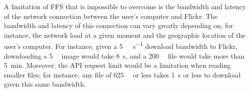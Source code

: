 A limitation of \gls{FFS} that is impossible to overcome is the bandwidth and latency of the network connection between the user's computer and Flickr. The bandwidth and latency of this connection can vary greatly depending on, for instance, the network load at a given moment and the geographic location of the user's computer. For instance, given a \SI[per-mode = symbol]{5}{\mega\bit\per\second} download bandwidth to Flickr, downloading a \SI[per-mode = symbol]{5}{\mega\byte} image would take \SI[per-mode = symbol]{8}{\second}, and a \SI[per-mode = symbol]{200}{\mega\byte} file would take more than \SI[per-mode = symbol]{5}{\minute}. Moreover, the \gls{API} request limit would be a limitation when reading smaller files; for instance, any file of \SI[per-mode = symbol]{625}{\kilo\byte} or less takes \SI[per-mode = symbol]{1}{\second} or less to download given this same bandwidth. 

%
